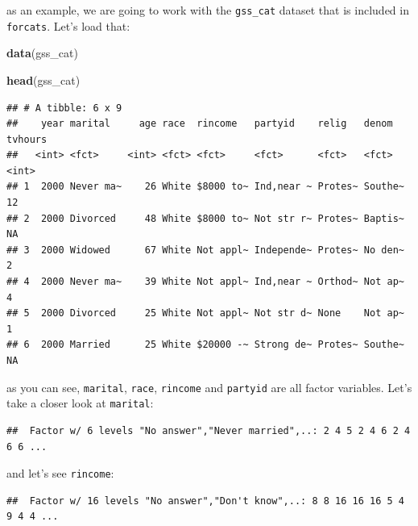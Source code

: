 \documentclass[]{gitbook}
\newenvironment{Shaded}{\begin{snugshade}}{\end{snugshade}}
\newcommand{\KeywordTok}[1]{\textcolor[rgb]{0.13,0.29,0.53}{\textbf{#1}}}
\newcommand{\NormalTok}[1]{#1}
\newcommand{\OperatorTok}[1]{\textcolor[rgb]{0.81,0.36,0.00}{\textbf{#1}}}
\theoremstyle{definition}
\theoremstyle{definition}
\theoremstyle{definition}
\theoremstyle{remark}
\begin{document}
as an example, we are going to work with the \texttt{gss\_cat} dataset
that is included in \texttt{forcats}. Let's load that:

\begin{Shaded}
\begin{Highlighting}[]
\KeywordTok{data}\NormalTok{(gss_cat)}

\KeywordTok{head}\NormalTok{(gss_cat)}
\end{Highlighting}
\end{Shaded}

\begin{verbatim}
## # A tibble: 6 x 9
##    year marital     age race  rincome   partyid    relig   denom   tvhours
##   <int> <fct>     <int> <fct> <fct>     <fct>      <fct>   <fct>     <int>
## 1  2000 Never ma~    26 White $8000 to~ Ind,near ~ Protes~ Southe~      12
## 2  2000 Divorced     48 White $8000 to~ Not str r~ Protes~ Baptis~      NA
## 3  2000 Widowed      67 White Not appl~ Independe~ Protes~ No den~       2
## 4  2000 Never ma~    39 White Not appl~ Ind,near ~ Orthod~ Not ap~       4
## 5  2000 Divorced     25 White Not appl~ Not str d~ None    Not ap~       1
## 6  2000 Married      25 White $20000 -~ Strong de~ Protes~ Southe~      NA
\end{verbatim}

as you can see, \texttt{marital}, \texttt{race}, \texttt{rincome} and
\texttt{partyid} are all factor variables. Let's take a closer look at
\texttt{marital}:

\begin{Shaded}
\end{Shaded}

\begin{verbatim}
##  Factor w/ 6 levels "No answer","Never married",..: 2 4 5 2 4 6 2 4 6 6 ...
\end{verbatim}

and let's see \texttt{rincome}:

\begin{Shaded}
\end{Shaded}

\begin{verbatim}
##  Factor w/ 16 levels "No answer","Don't know",..: 8 8 16 16 16 5 4 9 4 4 ...
\end{verbatim}
\end{document}
